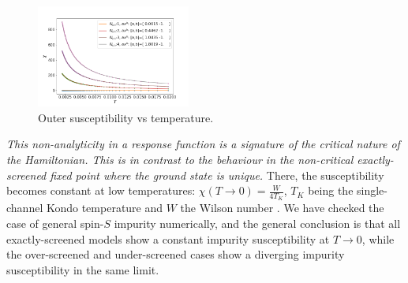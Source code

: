 \documentclass[reprint,prb,superscriptaddress]{revtex4-2}
\begin{document}
\begin{figure}
\centering
\includegraphics[width=0.45\textwidth]{plt/Outer_Field_Chi_Powerlaw_}
\caption{Outer susceptibility vs temperature.}
\label{fig:suseptibility_outer}
\end{figure}

\textit{This non-analyticity in a response function is a signature of the critical nature of the Hamiltonian. This is in contrast to the behaviour in the non-critical exactly-screened fixed point where the ground state is unique.} There, the susceptibility becomes constant at low temperatures: \(\chi(T\to 0) = \frac{W}{4 T_K}\), \(T_K\) being the single-channel Kondo temperature and \(W\) the Wilson number \cite{wilson1975renormalization,nozieres1974fermi,bullaNRGreview,kondo_urg}. We have checked the case of general spin-\(S\) impurity numerically, and the general conclusion is that all exactly-screened models show a constant impurity susceptibility at \(T \to 0\), while the over-screened and under-screened cases show a diverging impurity susceptibility in the same limit. 
\end{document}
